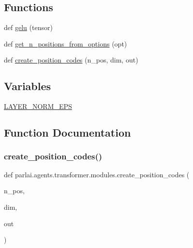 \subsection*{Functions}
\begin{DoxyCompactItemize}
\item 
def \hyperlink{namespaceparlai_1_1agents_1_1transformer_1_1modules_ad93916b8d2188c35733089e1581c44f8}{gelu} (tensor)
\item 
def \hyperlink{namespaceparlai_1_1agents_1_1transformer_1_1modules_ab67607512c597ddd54f2b60a1a1eaf4c}{get\+\_\+n\+\_\+positions\+\_\+from\+\_\+options} (opt)
\item 
def \hyperlink{namespaceparlai_1_1agents_1_1transformer_1_1modules_a0b86437e6e9682fa3100e9cadcaae259}{create\+\_\+position\+\_\+codes} (n\+\_\+pos, dim, out)
\end{DoxyCompactItemize}
\subsection*{Variables}
\begin{DoxyCompactItemize}
\item 
\hyperlink{namespaceparlai_1_1agents_1_1transformer_1_1modules_a05d7fdb12d6d53f201ad11c3a487bd18}{L\+A\+Y\+E\+R\+\_\+\+N\+O\+R\+M\+\_\+\+E\+PS}
\end{DoxyCompactItemize}


\subsection{Function Documentation}
\mbox{\label{namespaceparlai_1_1agents_1_1transformer_1_1modules_a0b86437e6e9682fa3100e9cadcaae259}} 
\subsubsection{\texorpdfstring{create\+\_\+position\+\_\+codes()}{create\_position\_codes()}}
{\footnotesize\ttfamily def parlai.\+agents.\+transformer.\+modules.\+create\+\_\+position\+\_\+codes (\begin{DoxyParamCaption}\item[{}]{n\+\_\+pos,  }\item[{}]{dim,  }\item[{}]{out }\end{DoxyParamCaption})}

